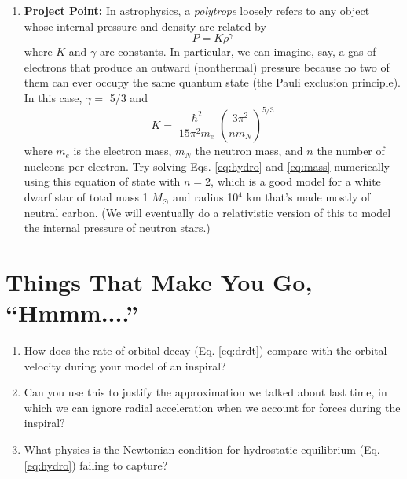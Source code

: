 \documentclass[11pt]{article}
\begin{document}
\begin{enumerate}
\item \textbf{Project Point:} In astrophysics, a \textit{polytrope} loosely refers to any object whose internal pressure and density are related by
\begin{equation}\label{eq:polytrope}
P = K \rho^{\gamma}
\end{equation}
where $K$ and $\gamma$ are constants. In particular, we can imagine, say, a gas of electrons that produce an outward (nonthermal) pressure because no two of them can ever occupy the same quantum state (the Pauli exclusion principle). In this case, $\gamma =$ 5/3 and
\[ K = \frac{\hslash^2}{15\pi^2 m_e} \left( \frac{3\pi^2}{n m_N} \right)^{5/3} \]
where $m_e$ is the electron mass, $m_N$ the neutron mass, and $n$ the number of nucleons per electron. Try solving Eqs. \ref{eq:hydro} and \ref{eq:mass} numerically using this equation of state with $n=2$, which is a good model for a white dwarf star of total mass 1 $M_{\odot}$ and radius 10$^4$ km that's made mostly of neutral carbon. (We will eventually do a relativistic version of this to model the internal pressure of neutron stars.)

\end{enumerate}


\section*{Things That Make You Go, ``Hmmm....''}

\begin{enumerate}

\item How does the rate of orbital decay (Eq. \ref{eq:drdt}) compare with the orbital velocity during your model of an inspiral?

\item Can you use this to justify the approximation we talked about last time, in which we can ignore radial acceleration when we account for forces during the inspiral?

\item What physics is the Newtonian condition for hydrostatic equilibrium (Eq. \ref{eq:hydro}) failing to capture?

\end{enumerate}

\vspace{1000pt}
\end{document}
